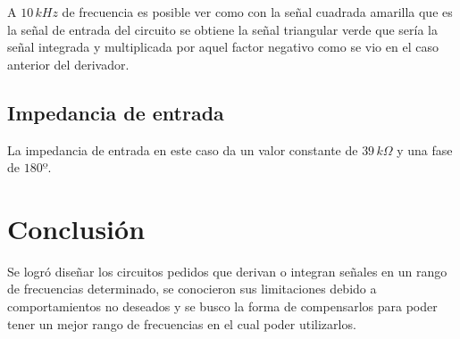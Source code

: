 A $10 \, kHz$ de frecuencia es posible ver como con la señal cuadrada amarilla que es la señal de entrada del circuito se obtiene la señal triangular verde que sería la señal integrada y multiplicada por aquel factor negativo como se vio en el caso anterior del derivador.

\subsection{Impedancia de entrada}
La impedancia de entrada en este caso da un valor constante de $39 \, k \Omega$ y una fase de $180º$.

\section{Conclusión}
Se logró diseñar los circuitos pedidos que derivan o integran señales en un rango de frecuencias determinado, se conocieron sus limitaciones debido a comportamientos no deseados y se busco la forma de compensarlos para poder tener un mejor rango de frecuencias en el cual poder utilizarlos.
